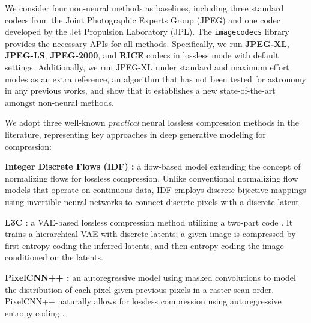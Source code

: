 We consider four non-neural methods as baselines, including three standard codecs from the Joint Photographic Experts Group (JPEG) and one codec developed by the Jet Propulsion Laboratory (JPL). The \texttt{imagecodecs} library provides the necessary APIs for all methods. Specifically, we run \textbf{JPEG-XL}, \textbf{JPEG-LS}, \textbf{JPEG-2000}, and \textbf{RICE} codecs in lossless mode with default settings. Additionally, we run JPEG-XL under standard and maximum effort modes as an extra reference, an algorithm that has not been tested for astronomy in any previous works, and show that it establishes a new state-of-the-art amongst non-neural methods. 

We adopt three well-known \textit{practical} neural lossless compression methods in the literature, representing key approaches in deep generative modeling for compression:

\textbf{Integer Discrete Flows (IDF) \citep{hoogeboom2019integer}:} a flow-based model extending the concept of normalizing flows \citep{rezende2015variational} for lossless compression. Unlike conventional normalizing flow models that operate on continuous data, IDF employs discrete bijective mappings using invertible neural networks to connect discrete pixels with a discrete latent.
    

\textbf{L3C \citep{mentzer2019practical}}: a VAE-based lossless compression method utilizing a two-part code \citep{yang2023introduction}. It trains a hierarchical VAE with discrete latents; a given image is compressed by first entropy coding the inferred latents, and then entropy coding the image conditioned on the latents.


\textbf{PixelCNN++ \citep{pixelcn}:} an autoregressive model using masked convolutions to model the distribution of each pixel given previous pixels in a raster scan order. 
PixelCNN++ naturally allows for lossless compression using autoregressive entropy coding \citep{mentzer2019practical}.

